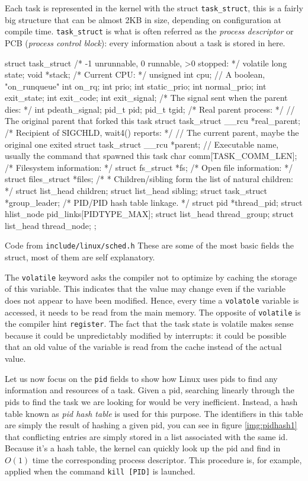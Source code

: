 Each task is represented in the kernel with the struct \verb|task_struct|, this is a fairly big structure that can be almost 2KB in size, depending on configuration at compile time. \verb|task_struct| is what is often referred as the \textit{process descriptor} or PCB (\textit{process control block}): every information about a task is stored in here. 
\begin{code}
struct task_struct {
	/* -1 unrunnable, 0 runnable, >0 stopped: */
	volatile long			state;
	void				*stack;
	/* Current CPU: */
	unsigned int			cpu;
	// A boolean, "on_runqueue"
	int				on_rq; 
	int				prio;
	int				static_prio;
	int				normal_prio;
        int				exit_state;
	int				exit_code;
	int				exit_signal;
	/* The signal sent when the parent dies: */
	int				pdeath_signal;
	pid_t				pid;
	pid_t				tgid;
        /* Real parent process: */
        // The original parent that forked this task
	struct task_struct __rcu	*real_parent;
	/* Recipient of SIGCHLD, wait4() reports: */
	// The current parent, maybe the original one exited
	struct task_struct __rcu	*parent;
	// Executable name, usually the command that spawned this task
	char				comm[TASK_COMM_LEN]; 
        /* Filesystem information: */
	struct fs_struct		   *fs;
	/* Open file information: */
	struct files_struct		*files;
	/*
	 * Children/sibling form the list of natural children:
	 */
	struct list_head		children;
	struct list_head		sibling;
	struct task_struct	   *group_leader;
	/* PID/PID hash table linkage. */
	struct pid			*thread_pid;
	struct hlist_node	   pid_links[PIDTYPE_MAX];
	struct list_head		thread_group;
	struct list_head		thread_node;
};
\end{code}
Code from \verb|include/linux/sched.h|\newline
These are some of the most basic fields the struct, most of them are self explanatory.

The \verb|volatile| keyword asks the compiler not to optimize by
caching the storage of this variable. This indicates that the value
may change even if the variable does not appear to have been
modified. Hence, every time a \texttt{volatole} variable is accessed,
it needs to be read from the main memory. The opposite of
\verb|volatile| is the compiler hint \verb|register|. The fact that
the task state is volatile makes sense because it could be
unpredictably modified by interrupts: it could be possible that an old
value of the variable is read from the cache instead of the actual
value.

Let us now focus on the \texttt{pid} fields to show how Linux uses
pids to find any information and resources of a task. Given a pid,
searching linearly through the pids to find the task we are looking
for would be very inefficient. Instead, a hash table known as
\textit{pid hash table} is used for this purpose. The identifiers in
this table are simply the result of hashing a given pid, you can see
in figure \ref{img:pidhash1} that conflicting entries are simply
stored in a list associated with the same id. Because it's a hash
table, the kernel can quickly look up the pid and find in $O(1)$ time
the corresponding process descriptor. This procedure is, for example,
applied when the command \verb|kill [PID]| is launched.

